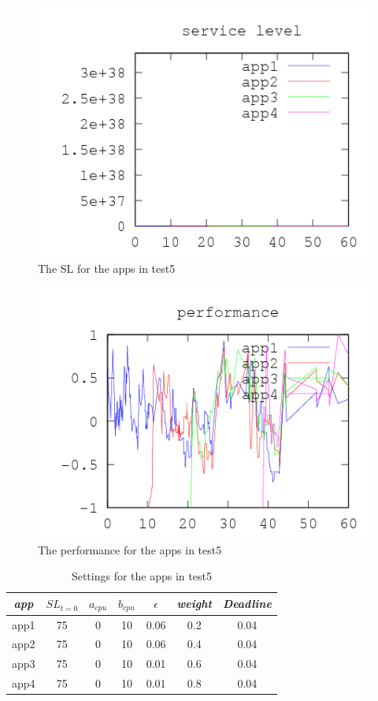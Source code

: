 \documentclass[nobiblatex]{LTHthesis}
\begin{document}
\begin{figure}[!H]
  \centering
  \includegraphics{"tools/plot/logs/test5/sl"}
  \caption{The SL for the apps in test5}
  \label{fig:test5_sl}
\end{figure}

\begin{figure}[!H]
  \centering
  \includegraphics{"tools/plot/logs/test5/f"}
  \caption{The performance for the apps in test5}
  \label{fig:test5_f}
\end{figure}



\begin{table}[h]
  \centering
  \begin{tabular}{|c|c|c|c|c|c|c|}
 	\hline 
   \emph{app} & $SL_{t=0}$ & \textbf{$a_{cpu}$} & \textbf{$b_{cpu}$} & \textbf{$\epsilon$} & \emph{weight} & \emph{Deadline} \\ \hline
	app1 & 75 & 0 & 10 & 0.06 & 0.2 &0.04  \\ \hline
	app2 & 75 & 0 & 10 & 0.06 & 0.4 &0.04  \\ \hline
	app3 & 75 & 0 & 10 & 0.01 & 0.6 &0.04  \\ \hline
	app4 & 75 & 0 & 10 & 0.01 & 0.8 &0.04  \\ \hline        
  \end{tabular}
  \caption{Settings for the apps in test5}
  \label{tab:settings_test5}
\end{table}
\end{document}

